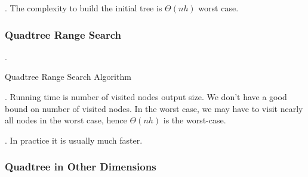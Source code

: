\documentclass{article}
\begin{document}
\begin{result}[].
    The complexity to build the initial tree is $\Theta(nh)$ worst case. 
\end{result}

\subsubsection{Quadtree Range Search}

\begin{codes}[].
    \begin{algorithm}[H]
        \SetAlgoLined
        \DontPrintSemicolon
        
        \caption{Quadtree Range Search Algorithm}
        
    \end{algorithm}
\end{codes}

\begin{discovery}[].
    Running time is number of visited nodes output size. We don't have a good bound on number of visited nodes. In the worst case, we may have to visit nearly all nodes in the worst case, hence $\Theta(nh)$ is the worst-case. 
    \begin{comm}[].
        In practice it is usually much faster. 
    \end{comm}
\end{discovery}

\subsubsection{Quadtree in Other Dimensions}
\end{document}
